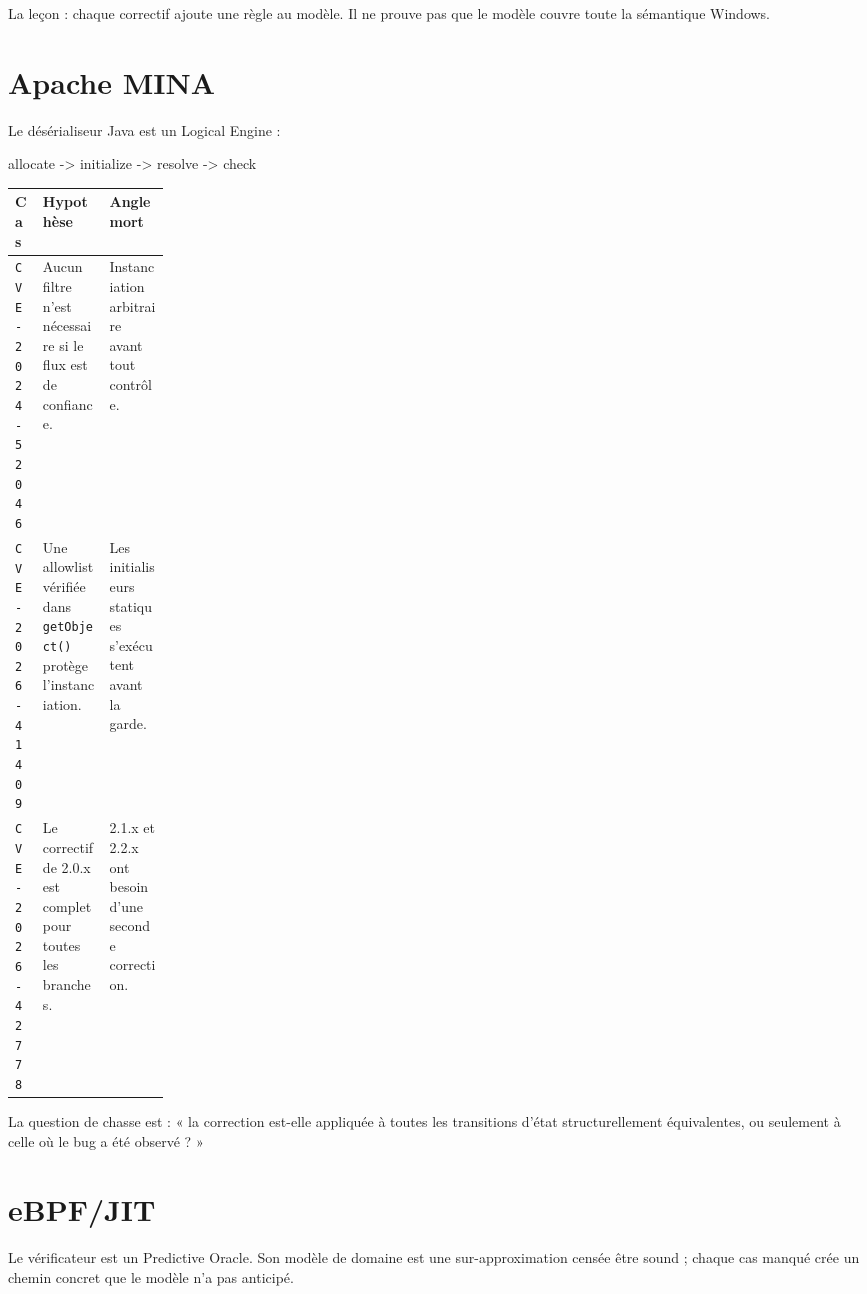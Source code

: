 \documentclass{training}
\begin{document}
La leçon : chaque correctif ajoute une règle au modèle. Il ne prouve pas que
le modèle couvre toute la sémantique Windows.

\section*{Apache MINA}

Le désérialiseur Java est un Logical Engine :

\begin{console}
allocate -> initialize -> resolve -> check
\end{console}

\begin{center}
\begin{tabularx}{\linewidth}{|p{0.18\linewidth}|X|X|}
\hline
\textbf{Cas} & \textbf{Hypothèse} & \textbf{Angle mort} \\ \hline
\texttt{CVE-2024-52046} & Aucun filtre n'est nécessaire si le flux est de
confiance. & Instanciation arbitraire avant tout contrôle. \\ \hline
\texttt{CVE-2026-41409} & Une allowlist vérifiée dans \texttt{getObject()}
protège l'instanciation. & Les initialiseurs statiques s'exécutent avant la
garde. \\ \hline
\texttt{CVE-2026-42778} & Le correctif de 2.0.x est complet pour toutes les
branches. & 2.1.x et 2.2.x ont besoin d'une seconde correction. \\ \hline
\end{tabularx}
\end{center}

La question de chasse est : « la correction est-elle appliquée à toutes les
transitions d'état structurellement équivalentes, ou seulement à celle où le
bug a été observé ? »

\section*{eBPF/JIT}

Le vérificateur est un Predictive Oracle. Son modèle de domaine est une
sur-approximation censée être sound ; chaque cas manqué crée un chemin
concret que le modèle n'a pas anticipé.
\end{document}

